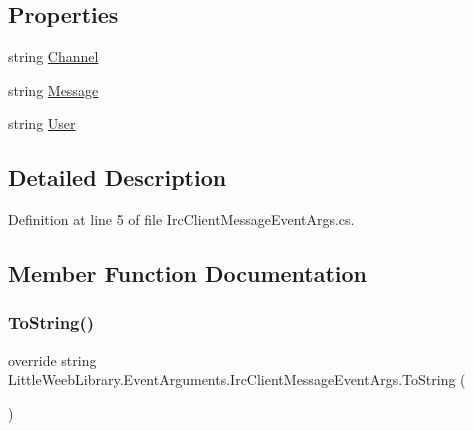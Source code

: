 \subsection*{Properties}
\begin{DoxyCompactItemize}
\item 
string \mbox{\hyperlink{class_little_weeb_library_1_1_event_arguments_1_1_irc_client_message_event_args_a89968e57254aa26cf1d41fa7a967ec61}{Channel}}
\item 
string \mbox{\hyperlink{class_little_weeb_library_1_1_event_arguments_1_1_irc_client_message_event_args_a00af672ceae9da43c1bcff12049fd78d}{Message}}
\item 
string \mbox{\hyperlink{class_little_weeb_library_1_1_event_arguments_1_1_irc_client_message_event_args_a93a50eb157a99b2b315ecb2439cc64db}{User}}
\end{DoxyCompactItemize}


\subsection{Detailed Description}


Definition at line 5 of file Irc\+Client\+Message\+Event\+Args.\+cs.



\subsection{Member Function Documentation}
\mbox{\label{class_little_weeb_library_1_1_event_arguments_1_1_irc_client_message_event_args_a0b8df2a044d27dec2dd963e978311be4}} 
\subsubsection{\texorpdfstring{To\+String()}{ToString()}}
{\footnotesize\ttfamily override string Little\+Weeb\+Library.\+Event\+Arguments.\+Irc\+Client\+Message\+Event\+Args.\+To\+String (\begin{DoxyParamCaption}{ }\end{DoxyParamCaption})}



